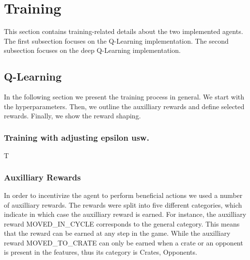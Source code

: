 \documentclass[
	letterpaper, %
	12pt, %
]{CSUniSchoolLabReport}
\begin{document}

\section{Training}
This section contains training-related details about the two implemented
agents. The first subsection focuses on the Q-Learning implementation. The
second subsection focuses on the deep Q-Learning implementation.



\subsection{Q-Learning}
In the following section we present the training process in general.
We start with the hyperparameters. Then, we outline the auxilliary rewards
and define selected rewards. Finally, we show the reward shaping.
\subsubsection{Training with adjusting epsilon usw.}
T


\subsubsection{Auxilliary Rewards \AB}
In order to incentivize the agent to perform beneficial actions we used a number of auxilliary rewards.
The rewards were split into five different categories, which indicate in which case the auxilliary reward
is earned. For instance, the auxilliary reward MOVED\_IN\_CYCLE corresponds to the general category. This
means that the reward can be earned at any step in the game. While the auxilliary reward MOVED\_TO\_CRATE can
only be earned when a crate or an opponent is present in the features, thus its category is Crates, Opponents.
\end{document}
